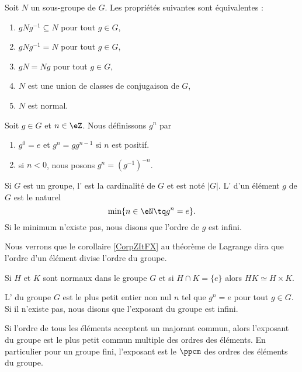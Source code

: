 \begin{proposition}
    Soit \( N\) un sous-groupe de \( G\). Les propriétés suivantes sont équivalentes :
    \begin{enumerate}
        \item
            \( gNg^{-1}\subseteq N\) pour tout \( g\in G\),
        \item
            \( gNg^{-1}= N\) pour tout \( g\in G\),
        \item
            \( gN=Ng\) pour tout \( g\in G\),
        \item
            \( N\) est une union de classes de conjugaison de \( G\),
        \item
            \( N\) est normal.
    \end{enumerate}
\end{proposition}

\begin{definition}
    Soit \( g\in G\) et \( n\in \eZ\). Nous définissons \( g^n\) par
    \begin{enumerate}
        \item
            \( g^0=e\) et \( g^n=gg^{n-1}\) si \( n\) est positif.
        \item
            si \( n<0\), nous posons \( g^n=(g^{-1})^{-n}\).
    \end{enumerate}
\end{definition}


\begin{definition}
    Si \( G\) est un groupe, l' est la cardinalité de \( G\) et est noté \( | G |\). L' d'un élément \( g\) de \( G\) est le naturel
    \begin{equation}
        \min\{ n\in\eN\tq g^n=e \}.
    \end{equation}
    Si le minimum n'existe pas, nous disons que l'ordre de \( g\) est infini.
\end{definition}
Nous verrons que le corollaire \ref{CorpZItFX} au théorème de Lagrange dira que l'ordre d'un élément divise l'ordre du groupe.

\begin{lemma}\label{LemHUkMxp}
    Si \( H\) et \( K\) sont normaux dans le groupe \( G\) et si \( H\cap K=\{ e \}\) alors \( HK\simeq H\times K\).
\end{lemma}

\begin{definition}  \label{DefvtSAyb}
    L' du groupe \( G\) est le plus petit entier non nul \( n\) tel que \( g^n=e\) pour tout \( g\in G\). Si il n'existe pas, nous disons que l'exposant du groupe est infini.
\end{definition}
Si l'ordre de tous les éléments acceptent un majorant commun, alors l'exposant du groupe est le plus petit commun multiple des ordres des éléments. En particulier pour un groupe fini, l'exposant est le $\ppcm$ des ordres des éléments du groupe.

